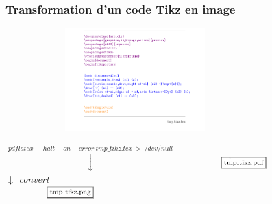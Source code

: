 \documentclass{beamer}
\begin{document}
\begin{frame}
\frametitle{Transformation d'un code Tikz en image}
\includegraphics[width=10cm, height=4cm]{img/c1.png} \\
\begin{center}
$\overset{pdflatex\ -halt-on-error\ tmp\_tikz.tex\ >\ /dev/null }{\downarrow}$
\includegraphics[width=5cm, height=0.5cm]{img/re1.png} \\
\hspace{11mm}
{\normalsize $\downarrow$ \textit{convert}}\\
\includegraphics[width=5cm, height=0.5cm]{img/re2.png} \\
\end{center}

\end{frame}
\end{document}
